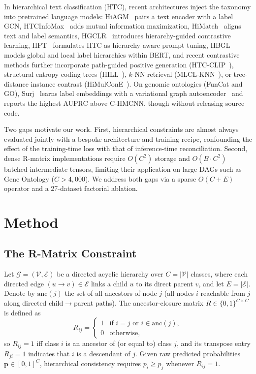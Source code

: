 \documentclass[conference]{IEEEtran}
\begin{document}
In hierarchical text classification (HTC), recent architectures inject the
taxonomy into pretrained language models: HiAGM~\cite{zhou2020hiagm} pairs a
text encoder with a label GCN, HTCInfoMax~\cite{htcinfomax} adds mutual
information maximization, HiMatch~\cite{himatch} aligns text and label
semantics, HGCLR~\cite{hgclr} introduces hierarchy-guided contrastive learning,
HPT~\cite{hpt} formulates HTC as hierarchy-aware prompt tuning,
HBGL~\cite{jiang2022hbgl} models global and local label hierarchies within
BERT, and recent contrastive methods further incorporate
path-guided positive generation (HTC-CLIP~\cite{htcclip2023}), structural
entropy coding trees (HILL~\cite{hill2024}), $k$-NN retrieval
(MLCL-KNN~\cite{mlclknn2024}), or tree-distance instance contrast
(HiMulConE~\cite{himulcone2022}). On genomic
ontologies (FunCat and GO), Surj~\cite{www2022ontology} learns label embeddings
with a variational graph autoencoder~\cite{kipf2016vgae} and reports the
highest AUPRC above C-HMCNN, though without releasing source code.

Two gaps motivate our work. First, hierarchical constraints are almost always
evaluated jointly with a bespoke architecture and training recipe, confounding
the effect of the training-time loss with that of inference-time
reconciliation. Second, dense R-matrix implementations require $O(C^2)$ storage
and $O(B\cdot C^2)$ batched intermediate tensors, limiting their application on
large DAGs such as Gene Ontology ($C > 4{,}000$). We address both gaps via a
sparse $O(C{+}E)$ operator and a 27-dataset factorial ablation.

\section{Method}
\label{sec:method}

\subsection{The R-Matrix Constraint}
Let $\mathcal{G} = (\mathcal{V}, \mathcal{E})$ be a directed acyclic hierarchy
over $C = |\mathcal{V}|$ classes, where each directed edge $(u \rightarrow v)
\in \mathcal{E}$ links a child $u$ to its direct parent $v$, and let $E =
|\mathcal{E}|$. Denote by $\text{anc}(j)$ the set of all ancestors of node $j$
(all nodes $i$ reachable from $j$ along directed child$\rightarrow$parent
paths). The ancestor-closure matrix $R \in \{0,1\}^{C\times C}$ is defined as
\begin{equation}
R_{ij} = \begin{cases}
1 & \text{if } i=j \text{ or } i \in \text{anc}(j),\\
0 & \text{otherwise,}
\end{cases}
\label{eq:rmatrix}
\end{equation}
so $R_{ij}=1$ iff class $i$ is an ancestor of (or equal to) class $j$, and its
transpose entry $R_{ji}=1$ indicates that $i$ is a descendant of $j$. Given raw
predicted probabilities $\mathbf{p} \in [0,1]^C$, hierarchical consistency
requires $p_i \ge p_j$ whenever $R_{ij}=1$.
\end{document}
